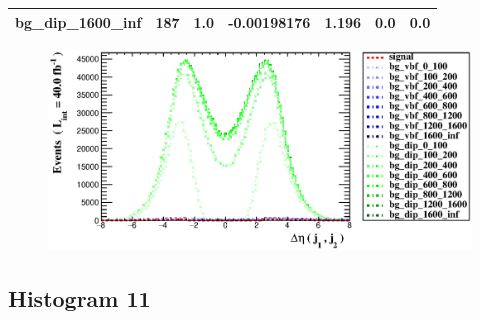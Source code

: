 \documentclass[a4paper, 10pt]{article}
\begin{document}
\begin{table}[H]
\begin{center}
\begin{tabular}{|m{23.0mm}|m{23.0mm}|m{18.0mm}|m{19.0mm}|m{19.0mm}|m{19.0mm}|m{19.0mm}|}
      \hline
      {\cellcolor{white}         bg\_dip\_1600\_inf}& {\cellcolor{white}         187}& {\cellcolor{white}         1.0}& {\cellcolor{white}         -0.00198176}& {\cellcolor{white}         1.196}& {\cellcolor{green}         0.0}& {\cellcolor{green}         0.0}\\
\hline
    \end{tabular}
  \end{center}
\end{table}

\begin{figure}[H]
  \begin{center}
    \includegraphics[scale=0.45]{selection_9.eps}\\
\caption{   }
  \end{center}
\end{figure}
      \newpage
\subsection{ Histogram 11}
\end{document}
